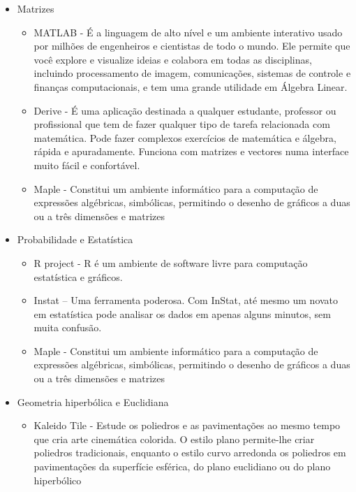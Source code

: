 \documentclass[12pt,a4paper]{article}
\begin{document}
\begin{itemize}
\item Matrizes

\begin{itemize}
\item  MATLAB - É a linguagem de alto nível e um ambiente interativo usado por milhões de engenheiros e cientistas de todo o mundo. Ele permite que você explore e visualize ideias e colabora em todas as disciplinas, incluindo processamento de imagem, comunicações, sistemas de controle e finanças computacionais, e tem uma grande utilidade em Álgebra Linear.

\item Derive - É uma aplicação destinada a qualquer estudante, professor ou profissional que tem de fazer qualquer tipo de tarefa relacionada com matemática. Pode fazer complexos exercícios de matemática e álgebra, rápida e apuradamente. Funciona com matrizes e vectores numa interface muito fácil e confortável.

\item Maple - Constitui um ambiente informático para a computação de expressões algébricas, simbólicas, permitindo o desenho de gráficos a duas ou a três dimensões e matrizes

\end{itemize}

\item Probabilidade e Estatística

\begin{itemize}
\item  R project - R é um ambiente de software livre para computação estatística e gráficos.

\item Instat – Uma ferramenta poderosa. Com InStat, até mesmo um novato em estatística pode analisar os dados em apenas alguns minutos, sem muita confusão.

\item Maple - Constitui um ambiente informático para a computação de expressões algébricas, simbólicas, permitindo o desenho de gráficos a duas ou a três dimensões e matrizes

\end{itemize}

\item Geometria hiperbólica e Euclidiana

\begin{itemize}
\item  Kaleido Tile -  Estude os poliedros e as pavimentações ao mesmo tempo que cria arte cinemática colorida. O estilo plano permite-lhe criar poliedros tradicionais, enquanto o estilo curvo arredonda os poliedros em pavimentações da superfície esférica, do plano euclidiano ou do plano hiperbólico


\end{itemize}
\end{itemize}
\end{document}
